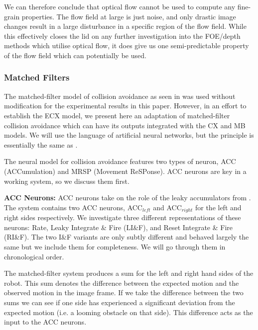 \documentclass[a4paper,11pt,twoside,openright]{article}
\begin{document}
We can therefore conclude that optical flow cannot be used to compute
any fine-grain properties. The flow field at large is just noise, and
only drastic image changes result in a large disturbance in a specific
region of the flow field. While this effectively closes the lid on any
further investigation into the FOE/depth methods which utilise optical
flow, it does give us one semi-predictable property of the flow field
which can potentially be used.

\subsubsection{Matched Filters}
The matched-filter model of collision avoidance as seen in
\cite{Mitchell2018} was used without modification for the experimental
results in this paper.  However, in an effort to establish the ECX
model, we present here an adaptation of matched-filter collision
avoidance which can have its outputs integrated with the CX and MB
models. We will use the language of artificial neural networks, but
the principle is essentially the same as \cite{Mitchell2018}.
\newline\par

The neural model for collision avoidance features two types of neuron, ACC
(ACCumulation) and MRSP (Movement ReSPonse). ACC neurons are key in a working
system, so we discuss them first.
\newline\par

\textbf{ACC Neurons:}
ACC neurons take on the role of the leaky accumulators from \cite{Mitchell2018,
  Stewart2010}. The system contains two ACC neurons, ACC$_{left}$ and
ACC$_{right}$ for the left and right sides respectively. We investigate three
different representations of these neurons: Rate, Leaky Integrate \& Fire
(LI\&F), and Reset Integrate \& Fire (RI\&F). The two I\&F variants are only
subtly different and behaved largely the same but we include them for
completeness. We will go through them in chronological order.
\newline\par

The matched-filter system produces a sum for the left and right hand sides of the
robot. This sum denotes the difference between the expected motion and the
observed motion in the image frame. If we take the difference between the two
sums we can see if one side has experienced a significant deviation from the
expected motion (i.e. a looming obstacle on that side). This difference acts
as the input to the ACC neurons.
\newline\par
\end{document}
